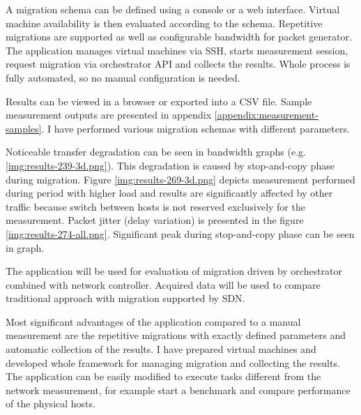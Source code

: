 A migration schema can be defined using a console or a web interface. Virtual machine availability is then evaluated according to the schema. Repetitive migrations are supported as well as configurable bandwidth for packet generator. 
The application manages virtual machines via \Ac{SSH}, starts measurement session, request migration via orchestrator \Ac{API} and collects the results. Whole process is fully automated, so no manual configuration is needed. 

Results can be viewed in a browser or exported into a \Ac{CSV} file. Sample measurement outputs are presented in appendix \ref{appendix:measurement-samples}. I have performed various migration schemas with different parameters. 

Noticeable transfer degradation can be seen in bandwidth graphs (e.g. \ref{img:results-239-3d.png}). This degradation is caused by stop-and-copy phase during migration. Figure \ref{img:results-269-3d.png} depicts measurement performed during period with higher load and results are significantly affected by other traffic because switch between hosts is not reserved exclusively for the measurement. Packet jitter (delay variation) is presented in the figure \ref{img:results-274-all.png}. Significant peak during stop-and-copy phase can be seen in graph.

The application will be used for evaluation of migration driven by orchestrator combined with network controller. Acquired data will be used to compare traditional approach with migration supported by \Ac{SDN}. 

Most significant advantages of the application compared to a manual measurement are the repetitive migrations with exactly defined parameters and automatic collection of the results. 
I have prepared virtual machines and developed whole framework for managing migration and collecting the results. 
The application can be easily modified to execute tasks different from the network measurement, for example start a benchmark and compare performance of the physical hosts.

